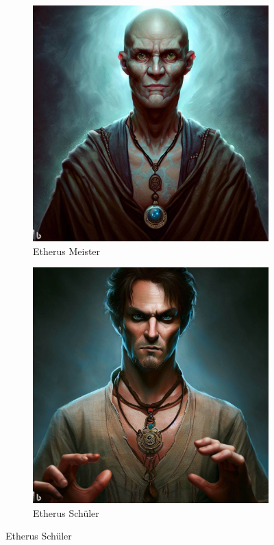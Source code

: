 \documentclass[11pt, twoside]{article}
\begin{document}
\begin{figure}[H]
\begin{subfigure}{0.3\textwidth}
    \includegraphics[width=0.99\linewidth]{etheri2.jpeg}
    \caption{Etherus Meister}
  \end{subfigure}%
  \begin{subfigure}{0.3\textwidth}
    \centering
    \includegraphics[width=0.99\linewidth]{etheri3.jpeg}
    \caption{Etherus Schüler}
  \end{subfigure}
\end{figure}
\end{document}
